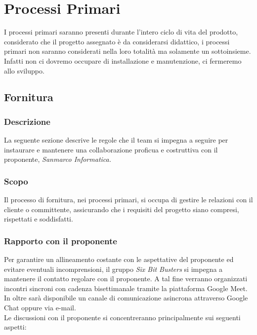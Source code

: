 \section{Processi Primari}
I processi primari saranno presenti durante l'intero ciclo di vita del prodotto, 
considerato che il progetto assegnato è da considerarsi didattico, i processi 
primari non saranno considerati nella loro totalità ma solamente un sottoinsieme.\\
Infatti non ci dovremo occupare di installazione e manutenzione, ci fermeremo allo sviluppo.

    \subsection{Fornitura}
        \subsubsection{Descrizione}
        La seguente sezione descrive le regole che il team si impegna a seguire 
        per instaurare e mantenere una collaborazione proficua e costruttiva con il proponente, 
        \textit{Sanmarco Informatica.}

        \subsubsection{Scopo}
        Il processo di fornitura, nei processi primari, si occupa di gestire le relazioni 
        con il cliente o committente, assicurando che i requisiti del progetto siano 
        compresi, rispettati e soddisfatti.

        \subsubsection{Rapporto con il proponente}
        Per garantire un allineamento costante con le aspettative del proponente ed evitare eventuali incomprensioni,
        il gruppo \textit{Six Bit Busters} si impegna a mantenere il contatto regolare con il proponente.
        A tal fine verranno organizzati incontri sincroni con cadenza bisettimanale tramite la piattaforma Google Meet. 
        In oltre sarà disponibile un canale di comunicazione asincrona attraverso Google Chat oppure via e-mail.\\


        Le discussioni con il proponente si concentreranno principalmente sui seguenti aspetti:

